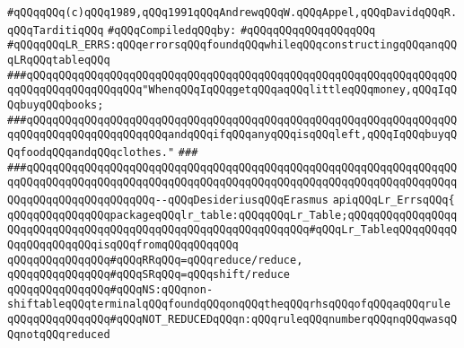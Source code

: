 \label{src/app/yacc/src/lr-errors.api}
\verb|#qQQqqQQq(c)qQQq1989,qQQq1991qQQqAndrewqQQqW.qQQqAppel,qQQqDavidqQQqR.qQQqTarditiqQQq|\newline
\newline
\verb|#qQQqCompiledqQQqby:|\newline
\verb|#qQQqqQQqqQQqqQQqqQQq|\newline
\newline
\verb|#qQQqqQQqLR_ERRS:qQQqerrorsqQQqfoundqQQqwhileqQQqconstructingqQQqanqQQqLRqQQqtableqQQq|\newline
\newline
\newline
\newline
\verb|###qQQqqQQqqQQqqQQqqQQqqQQqqQQqqQQqqQQqqQQqqQQqqQQqqQQqqQQqqQQqqQQqqQQqqQQqqQQqqQQqqQQqqQQq"WhenqQQqIqQQqgetqQQqaqQQqlittleqQQqmoney,qQQqIqQQqbuyqQQqbooks;|\newline
\verb|###qQQqqQQqqQQqqQQqqQQqqQQqqQQqqQQqqQQqqQQqqQQqqQQqqQQqqQQqqQQqqQQqqQQqqQQqqQQqqQQqqQQqqQQqqQQqandqQQqifqQQqanyqQQqisqQQqleft,qQQqIqQQqbuyqQQqfoodqQQqandqQQqclothes."|\newline
\verb|###|\newline
\verb|###qQQqqQQqqQQqqQQqqQQqqQQqqQQqqQQqqQQqqQQqqQQqqQQqqQQqqQQqqQQqqQQqqQQqqQQqqQQqqQQqqQQqqQQqqQQqqQQqqQQqqQQqqQQqqQQqqQQqqQQqqQQqqQQqqQQqqQQqqQQqqQQqqQQqqQQqqQQqqQQq--qQQqDesideriusqQQqErasmus|\newline
\newline
\newline
\newline
\verb|apiqQQqLr_ErrsqQQq{|\newline
\newline
\verb|qQQqqQQqqQQqqQQqpackageqQQqlr_table:qQQqqQQqLr_Table;qQQqqQQqqQQqqQQqqQQqqQQqqQQqqQQqqQQqqQQqqQQqqQQqqQQqqQQqqQQqqQQq#qQQqLr_TableqQQqqQQqqQQqqQQqqQQqqQQqisqQQqfromqQQqqQQqqQQq|\newline
\newline
\verb|qQQqqQQqqQQqqQQq#qQQqRRqQQq=qQQqreduce/reduce,|\newline
\verb|qQQqqQQqqQQqqQQq#qQQqSRqQQq=qQQqshift/reduce|\newline
\verb|qQQqqQQqqQQqqQQq#qQQqNS:qQQqnon-shiftableqQQqterminalqQQqfoundqQQqonqQQqtheqQQqrhsqQQqofqQQqaqQQqrule|\newline
\verb|qQQqqQQqqQQqqQQq#qQQqNOT_REDUCEDqQQqn:qQQqruleqQQqnumberqQQqnqQQqwasqQQqnotqQQqreduced|\newline
